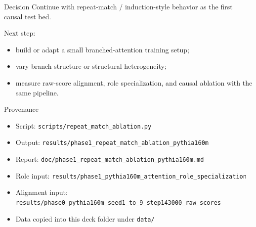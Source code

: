 \documentclass[aspectratio=169]{beamer}
\begin{document}
\begin{frame}{Decision}
  Continue with repeat-match / induction-style behavior as the first causal
  test bed.

  \vspace{0.8em}
  Next step:
  \begin{itemize}
    \item build or adapt a small branched-attention training setup;
    \item vary branch structure or structural heterogeneity;
    \item measure raw-score alignment, role specialization, and causal ablation
      with the same pipeline.
  \end{itemize}
\end{frame}

\begin{frame}{Provenance}
  \begin{itemize}
    \item Script: \texttt{scripts/repeat\_match\_ablation.py}
    \item Output: \texttt{results/phase1\_repeat\_match\_ablation\_pythia160m}
    \item Report: \texttt{doc/phase1\_repeat\_match\_ablation\_pythia160m.md}
    \item Role input: \texttt{results/phase1\_pythia160m\_attention\_role\_specialization}
    \item Alignment input: \texttt{results/phase0\_pythia160m\_seed1\_to\_9\_step143000\_raw\_scores}
    \item Data copied into this deck folder under \texttt{data/}
  \end{itemize}
\end{frame}
\end{document}
